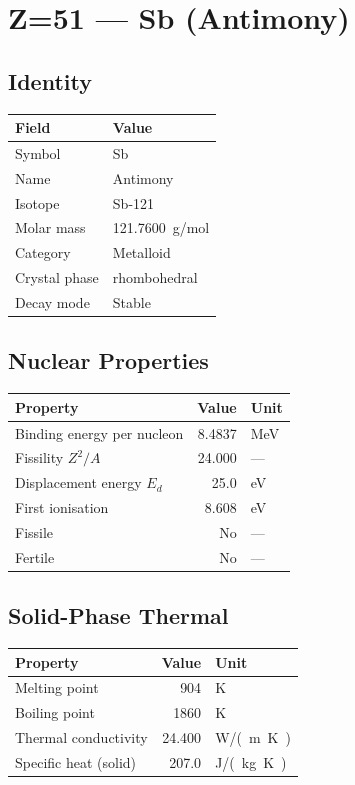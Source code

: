 \documentclass[11pt,a4paper]{article}
\begin{document}
\newpage

\section{Z=51 --- Sb (Antimony)}
\label{sec:Z51}

\subsection{Identity}
\begin{tabular}{ll}
  \toprule
  Field & Value \\
  \midrule
  Symbol & Sb \\
  Name & Antimony \\
  Isotope & Sb-121 \\
  Molar mass & \SI{121.7600}{g/mol} \\
  Category & Metalloid \\
  Crystal phase & rhombohedral \\
  Decay mode & Stable \\
  \bottomrule
\end{tabular}

\subsection{Nuclear Properties}
\begin{tabular}{lrl}
  \toprule
  Property & Value & Unit \\
  \midrule
  Binding energy per nucleon & 8.4837 & \si{MeV} \\
  Fissility $Z^2/A$ & 24.000 & --- \\
  Displacement energy $E_d$ & 25.0 & \si{eV} \\
  First ionisation & 8.608 & \si{eV} \\
  Fissile & No & --- \\
  Fertile & No & --- \\
  \bottomrule
\end{tabular}

\subsection{Solid-Phase Thermal}
\begin{tabular}{lrl}
  \toprule
  Property & Value & Unit \\
  \midrule
  Melting point & 904 & \si{K} \\
  Boiling point & 1860 & \si{K} \\
  Thermal conductivity & 24.400 & \si{W/(m.K)} \\
  Specific heat (solid) & 207.0 & \si{J/(kg.K)} \\
  \bottomrule
\end{tabular}
\end{document}
